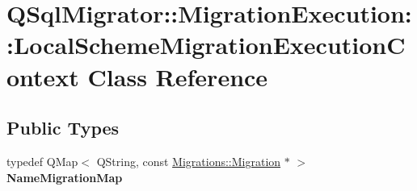 \hypertarget{class_q_sql_migrator_1_1_migration_execution_1_1_local_scheme_migration_execution_context}{}\section{Q\+Sql\+Migrator\+:\+:Migration\+Execution\+:\+:Local\+Scheme\+Migration\+Execution\+Context Class Reference}
\label{class_q_sql_migrator_1_1_migration_execution_1_1_local_scheme_migration_execution_context}
\subsection*{Public Types}
\begin{DoxyCompactItemize}
\item 
\mbox{\label{class_q_sql_migrator_1_1_migration_execution_1_1_local_scheme_migration_execution_context_ad8740e5b19aab207f95cb0c5b67b6c85}} 
typedef Q\+Map$<$ Q\+String, const \hyperlink{class_q_sql_migrator_1_1_migrations_1_1_migration}{Migrations\+::\+Migration} $\ast$ $>$ {\bfseries Name\+Migration\+Map}
\end{DoxyCompactItemize}
